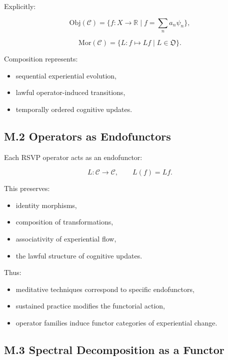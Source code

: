 \documentclass[12pt]{article}
\begin{document}
Explicitly:

\[
\mathrm{Obj}(\mathcal{C})
=
\{ f : X \to \mathbb{R} \mid f = \sum_n a_n \psi_n \},
\]

\[
\mathrm{Mor}(\mathcal{C})
=
\{ L : f \mapsto Lf \mid L \in \mathfrak{O} \}.
\]

Composition represents:

\begin{itemize}
    \item sequential experiential evolution,
    \item lawful operator-induced transitions,
    \item temporally ordered cognitive updates.
\end{itemize}

\subsection*{M.2 Operators as Endofunctors}

Each RSVP operator acts as an endofunctor:

\[
L : \mathcal{C} \to \mathcal{C},
\qquad
L(f) = Lf.
\]

This preserves:

\begin{itemize}
    \item identity morphisms,
    \item composition of transformations,
    \item associativity of experiential flow,
    \item the lawful structure of cognitive updates.
\end{itemize}

Thus:

\begin{itemize}
    \item meditative techniques correspond to specific endofunctors,
    \item sustained practice modifies the functorial action,
    \item operator families induce functor categories of experiential change.
\end{itemize}

\subsection*{M.3 Spectral Decomposition as a Functor}
\end{document}
